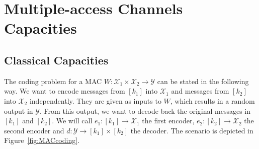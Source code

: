\section{Multiple-access Channels Capacities}
\label{section:capacity}
\subsection{Classical Capacities}
 

The coding problem for a MAC $W : \mathcal{X}_1 \times \mathcal{X}_2 \rightarrow \mathcal{Y}$ can be stated in the following way. We want to encode messages from $[k_1]$ into $\mathcal{X}_1$ and messages from $[k_2]$ into $\mathcal{X}_2$ independently. They are given as inputs to $W$, which results in a random output in $\mathcal{Y}$. From this output, we want to decode back the original messages in $[k_1]$ and $[k_2]$. We will call $e_1 : [k_1] \rightarrow \mathcal{X}_1$ the first encoder, $e_2 : [k_2] \rightarrow \mathcal{X}_2$ the second encoder and $d : \mathcal{Y} \rightarrow [k_1] \times [k_2]$ the decoder. The scenario is depicted in Figure~\ref{fig:MACcoding}.

